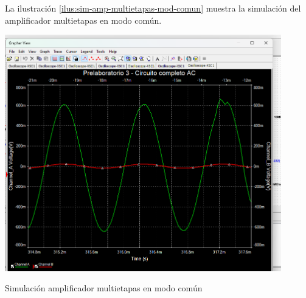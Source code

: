 La ilustración \ref{ilus:sim-amp-multietapas-mod-comun} muestra la simulación del amplificador multietapas en modo común.

\begin{ilustracion}[ht]
    \centering
    \includegraphics[width=0.9\textwidth]{src/images/p3/multietapa-modo-comun-ganancia.png}
    \caption{Simulación amplificador multietapas en modo común}
    \label{ilus:sim-amp-multietapas-mod-comun}
\end{ilustracion}
